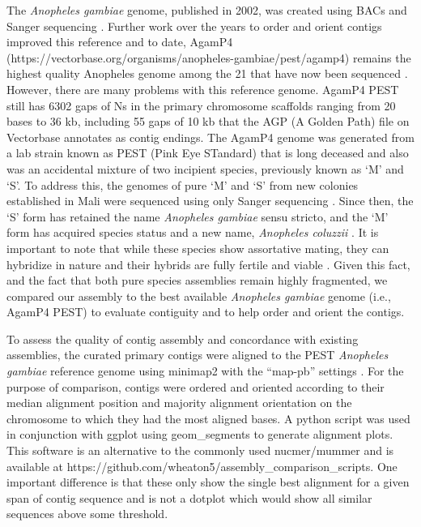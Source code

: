 \par{
The \textit{Anopheles gambiae} genome, published in 2002, was created using BACs and Sanger sequencing \cite{PEST}. Further work over the years to order and orient contigs improved this reference \cite{PEST2}\cite{heterochromatin} and to date, AgamP4 (https://vectorbase.org/organisms/anopheles-gambiae/pest/agamp4) remains the highest quality Anopheles genome among the 21 that have now been sequenced \cite{16anopheles}. However, there are many problems with this reference genome. AgamP4 PEST still has 6302 gaps of Ns in the primary chromosome scaffolds ranging from 20 bases to 36 kb, including 55 gaps of 10 kb that the AGP (A Golden Path) file on Vectorbase annotates as contig endings. The AgamP4 genome was generated from a lab strain known as PEST (Pink Eye STandard) that is long deceased and also was an accidental mixture of two incipient species, previously known as `M' and `S'. To address this, the genomes of pure `M' and `S' from new colonies established in Mali were sequenced using only Sanger sequencing \cite{anophdivergence}. Since then, the `S' form has retained the name \textit{Anopheles gambiae} sensu stricto, and the `M' form has acquired species status and a new name, \textit{Anopheles coluzzii} \cite{gambiaecomplex}. It is important to note that while these species show assortative mating, they can hybridize in nature and their hybrids are fully fertile and viable \cite{assortativemating}. Given this fact, and the fact that both pure species assemblies remain highly fragmented, we compared our assembly to the best available \textit{Anopheles gambiae} genome (i.e., AgamP4 PEST) to evaluate contiguity and to help order and orient the contigs.
} \\

\par{
To assess the quality of contig assembly and concordance with existing assemblies, the curated primary contigs were aligned to the PEST \textit{Anopheles gambiae} reference genome \cite{PEST}\cite{PEST2} using minimap2 with the ``map-pb'' settings \cite{minimap2}. For the purpose of comparison, contigs were ordered and oriented according to their median alignment position and majority alignment orientation on the chromosome to which they had the most aligned bases. A python script was used in conjunction with ggplot using geom\_segments to generate alignment plots. This software is an alternative to the commonly used nucmer/mummer \cite{mummer} and is available at https://github.com/wheaton5/assembly\_comparison\_scripts. One important difference is that these only show the single best alignment for a given span of contig sequence and is not a dotplot which would show all similar sequences above some threshold.
} \\

